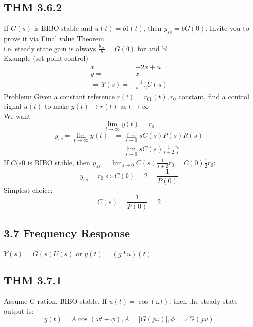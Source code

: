 \documentclass[letterpaper]{article}
\begin{document}
\subsection*{THM 3.6.2}
If $G(s)$ is BIBO stable and $u(t)=b1(t)$, then $y_{ss}=bG(0)$. Invite you to prove it via Final value Theorem.\\
i.e. steady state gain is always $\frac{y_{ss}}{b}=G(0)$ for and b!\\
Example (set-point control)
\begin{align*}
	\dot x=           & -2x+u             \\
	y=                & x                 \\
	\Rightarrow Y(s)= & \frac{1}{s+2}U(s) 
\end{align*}		    
Problem: Given a constant reference $r(t)=r_01(t), r_0$ constant, find a control signal $u(t)$ to make $y(t)\rightarrow r(t)$ as $t\rightarrow \infty$\\
We want $$\lim_{t\rightarrow \infty} y(t)=r_0$$
\begin{align*}
	y_{ss}=\lim_{t\rightarrow \infty} y(t) & =\lim_{s\rightarrow 0} sC(s)P(s)R(s)                  \\
	                                       & =\lim_{s\rightarrow 0}sC(s)\frac{1}{s+2}\frac{r_0}{s} 
\end{align*}
If $C(s0$ is BIBO stable, then $y_{ss}=\lim_{s\rightarrow 0} C(s)\frac{1}{s+2}r_0=C(0)\frac{1}{2}r_0$: $$y_{ss}=r_0 \iff C(0)=2=\frac{1}{P(0)}$$
Simplest choice: $$C(s)=\frac{1}{P(0)}=2$$
\subsection*{3.7 Frequency Response}
$Y(s) = G(s)U(s)$ or $y(t)=(g*u)(t)$
\subsection*{THM 3.7.1}
Assume G ration, BIBO stable. If $u(t)=\cos(\omega t)$, then the steady state output is: 
$$y(t)=A\cos(\omega t+\phi), A=|G(j\omega)|,\phi=\angle G(j\omega)$$
\end{document}
